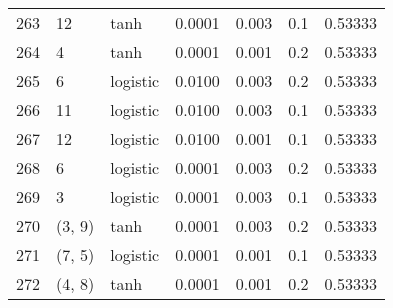 \begin{tabular}{lllrrrr}
263 &          12 &      tanh &  0.0001 &  0.003 &  0.1 &   0.53333 \\
264 &           4 &      tanh &  0.0001 &  0.001 &  0.2 &   0.53333 \\
265 &           6 &  logistic &  0.0100 &  0.003 &  0.2 &   0.53333 \\
266 &          11 &  logistic &  0.0100 &  0.003 &  0.1 &   0.53333 \\
267 &          12 &  logistic &  0.0100 &  0.001 &  0.1 &   0.53333 \\
268 &           6 &  logistic &  0.0001 &  0.003 &  0.2 &   0.53333 \\
269 &           3 &  logistic &  0.0001 &  0.003 &  0.1 &   0.53333 \\
270 &      (3, 9) &      tanh &  0.0001 &  0.003 &  0.2 &   0.53333 \\
271 &      (7, 5) &  logistic &  0.0001 &  0.001 &  0.1 &   0.53333 \\
272 &      (4, 8) &      tanh &  0.0001 &  0.001 &  0.2 &   0.53333 \\
\bottomrule
\end{tabular}
